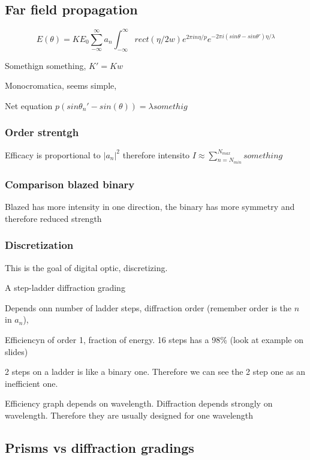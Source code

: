 \documentclass[../main/main.tex]{subfiles}
\begin{document}
\subsection{Far field propagation}

\begin{equation}
E(\theta) = K E_{0}\sum_{-\infty}^{\infty} a_{n} \int_{-\infty}^{\infty} rect(\eta/2w) e^{2\pi i n \eta / p}e^{-2 \pi i (sin \theta - sin \theta') \eta/\lambda}
\end{equation}

Somethign something, $K' = Kw$

Monocromatica, seems simple,

Net equation $p (sin \theta_{n}' - sin(\theta)) = \lambda somethig$

\subsubsection{Order strentgh}

Efficacy is proportional to $|a_{n}|^{2}$ therefore intensito $I \approx \sum_{n=N_{min}}^{N_{max}} something$


\subsubsection{Comparison blazed binary}

Blazed has more intensity in one direction, the binary has more symmetry and therefore reduced strength

\subsubsection{Discretization}

This is the goal of digital optic, discretizing.

A step-ladder diffraction grading

Depends onn number of ladder steps, diffraction order (remember order is the $n$ in $a_{n}$),

Efficiencyn of order 1, fraction of energy. 16 steps has a 98\% (look at example on slides)

2 steps on a ladder is like a binary one. Therefore we can see the 2 step one as an inefficient one.


Efficiency graph depends on wavelength. Diffraction depends strongly on wavelength. Therefore they are usually designed for one wavelength


\subsection{Prisms vs diffraction gradings}
\end{document}
